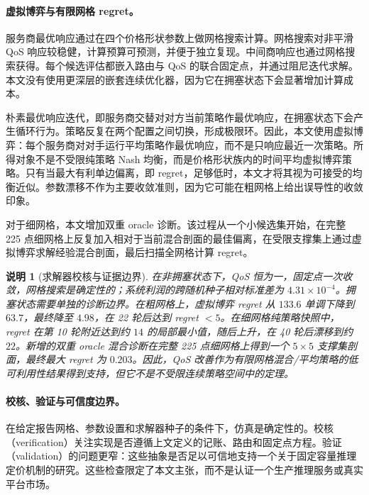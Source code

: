 \documentclass[UTF8,11pt,a4paper]{ctexart}
\newtheorem{remark}{说明}
\begin{document}
\paragraph{虚拟博弈与有限网格 regret。}

服务商最优响应通过在四个价格形状参数上做网格搜索计算。网格搜索对非平滑 QoS 响应较稳健，计算预算可预测，并便于独立复现。中间商响应也通过网格搜索获得。每个候选评估都嵌入路由与 QoS 的联合固定点，并通过阻尼迭代求解。本文没有使用更深层的嵌套连续优化器，因为它在拥塞状态下会显著增加计算成本。

朴素最优响应迭代，即服务商交替对对方当前策略作最优响应，在拥塞状态下会产生循环行为。策略反复在两个配置之间切换，形成极限环。因此，本文使用虚拟博弈：每个服务商对对手运行平均策略作最优响应，而不是只响应最近一次策略。所得对象不是不受限纯策略 Nash 均衡，而是价格形状族内的时间平均虚拟博弈策略。只有当最大有利单边偏离，即 regret，足够低时，本文才将其视为可接受的均衡近似。参数漂移不作为主要收敛准则，因为它可能在粗网格上给出误导性的收敛印象。

对于细网格，本文增加双重 oracle 诊断。该过程从一个小候选集开始，在完整 225 点细网格上反复加入相对于当前混合剖面的最佳偏离，在受限支撑集上通过虚拟博弈求解经验混合剖面，最后扫描全网格计算 regret。

\begin{remark}[求解器校核与证据边界]
在非拥塞状态下，QoS 恒为一，固定点一次收敛，网格搜索是确定性的；系统利润的跨随机种子相对标准差为 $4.31\times10^{-4}$。拥塞状态需要单独的诊断边界。在粗网格上，虚拟博弈 regret 从 $133.6$ 单调下降到 $63.7$，最终降至 $4.98$，在 22 轮后达到 regret $<5$。在细网格纯策略快照中，regret 在第 10 轮附近达到约 $14$ 的局部最小值，随后上升，在 40 轮后漂移到约 $22$。新增的双重 oracle 混合诊断在完整 225 点细网格上得到一个 $5\times5$ 支撑集剖面，最终最大 regret 为 $0.203$。因此，QoS 改善作为有限网格混合/平均策略的低可利用性结果得到支持，但它不是不受限连续策略空间中的定理。
\end{remark}

\paragraph{校核、验证与可信度边界。}
\label{sec:vv}

在给定报告网格、参数设置和求解器种子的条件下，仿真是确定性的。校核（verification）关注实现是否遵循上文定义的记账、路由和固定点方程。验证（validation）的问题更窄：这些抽象是否足以可信地支持一个关于固定容量推理定价机制的研究。这些检查限定了本文主张，而不是认证一个生产推理服务或真实平台市场。
\end{document}
